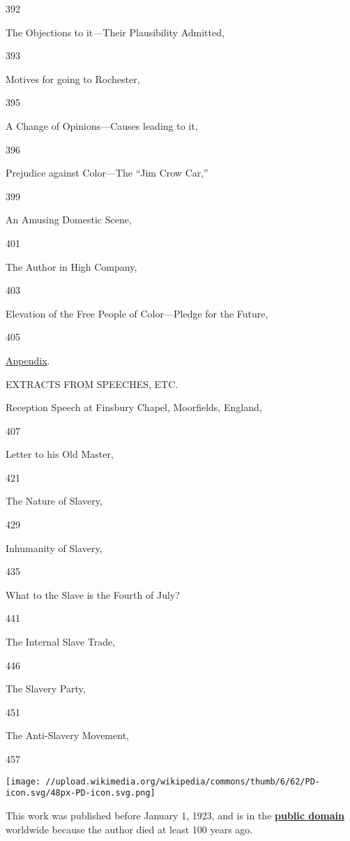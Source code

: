 392

The Objections to it---Their Plausibility Admitted,

393

Motives for going to Rochester,

395

A Change of Opinions---Causes leading to it,

396

Prejudice against Color---The ``Jim Crow Car,''

399

An Amusing Domestic Scene,

401

The Author in High Company,

403

Elevation of the Free People of Color---Pledge for the Future,

405

\href{/wiki/My_Bondage_and_My_Freedom_(1855)/Appendix}{Appendix}.

EXTRACTS FROM SPEECHES, ETC.

Reception Speech at Finsbury Chapel, Moorfields, England,

407

Letter to his Old Master,

421

The Nature of Slavery,

429

Inhumanity of Slavery,

435

What to the Slave is the Fourth of July?

441

The Internal Slave Trade,

446

The Slavery Party,

451

The Anti-Slavery Movement,

457

\protect\hypertarget{imageLeft}{}{\texttt{[image: //upload.wikimedia.org/wikipedia/commons/thumb/6/62/PD-icon.svg/48px-PD-icon.svg.png]}}

\hypertarget{licFrame-centertext}{}
This work was published before January 1, 1923, and is in the
\textbf{\href{https://en.wikipedia.org/wiki/Public_domain}{public
domain}} worldwide because the author died at least 100 years ago.

\protect\hypertarget{noimageRight}{}{~}

